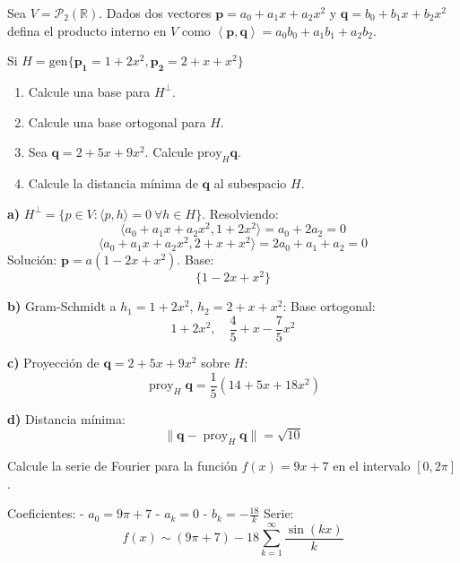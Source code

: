 \begin{prob}
Sea $V=\mathcal{P}_{2}(\mathbb{R})$. Dados dos vectores $\mathbf{p}=a_0+a_1x+a_2x^2$ y  $\mathbf{q}=b_0+b_1x+b_2x^2$  defina el producto interno en $V$ como $\left\langle \mathbf{p},\mathbf{q} \right\rangle=a_0b_0+a_1b_1+a_2b_2$. 

Si $H=\text{gen}\lbrace \mathbf{p_1}=1+2x^2,\mathbf{p_2}=2+x+x^2\rbrace$ 
\begin{enumerate}
\item Calcule una base para $H^{\perp}$.
\item Calcule una base ortogonal para $H$.
\item Sea $\mathbf{q}=2+5x+9x^2$. Calcule $\text{proy}_{H}\mathbf{q}$.
\item Calcule la distancia mínima de $\mathbf{q}$ al subespacio $H$.
\end{enumerate}
\begin{myproof}
\textbf{a)} \( H^\perp = \{ p \in V : \langle p, h \rangle = 0 \ \forall h \in H \} \).  
Resolviendo:
\[
\langle a_0 + a_1x + a_2x^2, 1 + 2x^2 \rangle = a_0 + 2a_2 = 0
\]
\[
\langle a_0 + a_1x + a_2x^2, 2 + x + x^2 \rangle = 2a_0 + a_1 + a_2 = 0
\]
Solución: \( \mathbf{p} = a(1 - 2x + x^2) \). Base:
\[
\boxed{\{1 - 2x + x^2\}}
\]

\textbf{b)} Gram-Schmidt a \( h_1 = 1 + 2x^2 \), \( h_2 = 2 + x + x^2 \):  
Base ortogonal:
\[
\boxed{1 + 2x^2,\quad \frac{4}{5} + x - \frac{7}{5}x^2}
\]

\textbf{c)} Proyección de \( \mathbf{q} = 2 + 5x + 9x^2 \) sobre \( H \):
\[
\operatorname{proy}_H \mathbf{q} = \frac{1}{5}(14 + 5x + 18x^2)
\]

\textbf{d)} Distancia mínima:
\[
\|\mathbf{q} - \operatorname{proy}_H \mathbf{q}\| = \sqrt{10}
\]
\end{myproof}
\end{prob}

\begin{prob}
Calcule la serie de Fourier para la función $f(x)=9x+7$ en el intervalo $[0,2\pi]$.
\begin{myproof}
Coeficientes:
- \( a_0 = 9\pi + 7 \)
- \( a_k = 0 \)
- \( b_k = -\frac{18}{k} \)
Serie:
\[
\boxed{f(x) \sim (9\pi + 7) - 18 \sum_{k=1}^{\infty} \frac{\sin(kx)}{k}}
\]
\end{myproof}
\end{prob}

